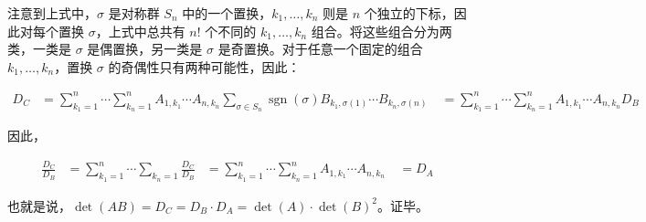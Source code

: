 \documentclass[../main.tex]{subfiles}
\begin{document}
注意到上式中，$\sigma$ 是对称群 $S_n$ 中的一个置换，$k_1,\ldots,k_n$ 则是 $n$ 个独立的下标，因此对每个置换 $\sigma$，上式中总共有 $n!$ 个不同的 $k_1,\ldots,k_n$ 组合。将这些组合分为两类，一类是 $\sigma$ 是偶置换，另一类是 $\sigma$ 是奇置换。对于任意一个固定的组合 $k_1,\ldots,k_n$，置换 $\sigma$ 的奇偶性只有两种可能性，因此：

\begin{align*}
D_C &= \sum_{k_1=1}^n \cdots \sum_{k_n=1}^n A_{1,k_1} \cdots A_{n,k_n} \sum_{\sigma \in S_n} \operatorname{sgn}(\sigma) B_{k_1,\sigma(1)} \cdots B_{k_n,\sigma(n)} \
&= \sum_{k_1=1}^n \cdots \sum_{k_n=1}^n A_{1,k_1} \cdots A_{n,k_n} D_B
\end{align*}

因此，

\begin{align*}
\frac{D_C}{D_B} &= \sum_{k_1=1}^n \cdots \sum_{k_n=1}
\frac{D_C}{D_B} &= \sum_{k_1=1}^n \cdots \sum_{k_n=1}^n A_{1,k_1} \cdots A_{n,k_n} \
&= D_A
\end{align*}

也就是说，$\det(AB) = D_C = D_B \cdot D_A = \det(A) \cdot \det(B)^2$。证毕。
\end{document}

